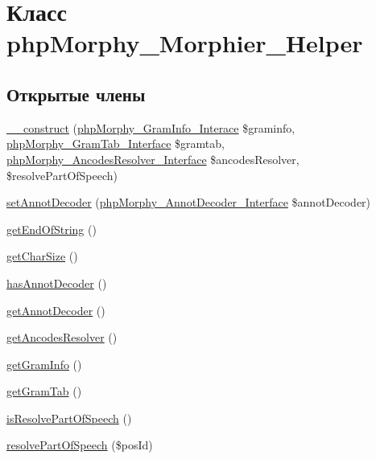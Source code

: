 \hypertarget{classphpMorphy__Morphier__Helper}{
\section{Класс phpMorphy\_\-Morphier\_\-Helper}
\label{classphpMorphy__Morphier__Helper}
}
\subsection*{Открытые члены}
\begin{DoxyCompactItemize}
\item 
\hyperlink{classphpMorphy__Morphier__Helper_a0771671628e208ea076d9b05392a7048}{\_\-\_\-construct} (\hyperlink{interfacephpMorphy__GramInfo__Interace}{phpMorphy\_\-GramInfo\_\-Interace} \$graminfo, \hyperlink{interfacephpMorphy__GramTab__Interface}{phpMorphy\_\-GramTab\_\-Interface} \$gramtab, \hyperlink{interfacephpMorphy__AncodesResolver__Interface}{phpMorphy\_\-AncodesResolver\_\-Interface} \$ancodesResolver, \$resolvePartOfSpeech)
\item 
\hyperlink{classphpMorphy__Morphier__Helper_aeba31a1df3969ca4cf32aa1ea90bdf95}{setAnnotDecoder} (\hyperlink{interfacephpMorphy__AnnotDecoder__Interface}{phpMorphy\_\-AnnotDecoder\_\-Interface} \$annotDecoder)
\item 
\hyperlink{classphpMorphy__Morphier__Helper_a8a9ac0d2390dddf2d71c17fa0a0d6b61}{getEndOfString} ()
\item 
\hyperlink{classphpMorphy__Morphier__Helper_a61b2f1e8e4618672ddb957225588b81b}{getCharSize} ()
\item 
\hyperlink{classphpMorphy__Morphier__Helper_ab0c5bb043c2542996e43c9d3f30058a9}{hasAnnotDecoder} ()
\item 
\hyperlink{classphpMorphy__Morphier__Helper_ac665d62c4633faeed3ae5e9d46d987c4}{getAnnotDecoder} ()
\item 
\hyperlink{classphpMorphy__Morphier__Helper_afb18bfb4d51f6597562e4341042682fb}{getAncodesResolver} ()
\item 
\hyperlink{classphpMorphy__Morphier__Helper_ad1172d439e8df03f97fbfde634aaf566}{getGramInfo} ()
\item 
\hyperlink{classphpMorphy__Morphier__Helper_abdd34d64ed0ffe7bc349bcfeddbf1701}{getGramTab} ()
\item 
\hyperlink{classphpMorphy__Morphier__Helper_a245de8f75489ea42d6319b6e19d92381}{isResolvePartOfSpeech} ()
\item 
\hyperlink{classphpMorphy__Morphier__Helper_a94691a01bfa392e37aa91090a6c6fb30}{resolvePartOfSpeech} (\$posId)

\end{DoxyCompactItemize}
